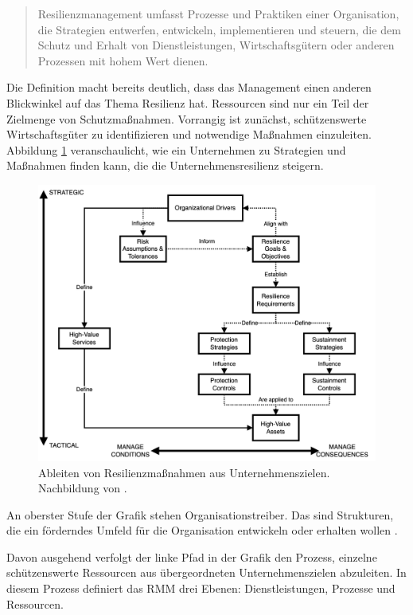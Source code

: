 \documentclass[]{lni}
\begin{document}
\begin{quote}
    Resilienzmanagement umfasst Prozesse und Praktiken einer Organisation, die Strategien entwerfen, entwickeln, implementieren und steuern, die dem Schutz und Erhalt von Dienstleistungen, Wirtschaftsgütern oder anderen Prozessen mit hohem Wert dienen.
    \cite[19]{CERT_RMM}
\end{quote}

Die Definition macht bereits deutlich, dass das Management einen anderen Blickwinkel auf das Thema Resilienz hat. Ressourcen sind nur ein Teil der Zielmenge von Schutzmaßnahmen. Vorrangig ist zunächst, schützenswerte Wirtschaftsgüter zu identifizieren und notwendige Maßnahmen einzuleiten. Abbildung \ref{fig:RmmServicesToAssets} veranschaulicht, wie ein Unternehmen zu Strategien und Maßnahmen finden kann, die die Unternehmensresilienz steigern.



\begin{figure}[ht]
    \centering
    \includegraphics[width=.9\textwidth]{images/RMM_strategy_deriviation_graph.drawio.png}
    \caption{Ableiten von Resilienzmaßnahmen aus Unternehmenszielen. Nachbildung von \cite[S. 26, Figure 9]{CERT_RMM}.}
    \label{fig:RmmServicesToAssets}
\end{figure}



An oberster Stufe der Grafik stehen Organisationstreiber. Das sind Strukturen, die ein förderndes Umfeld für die Organisation entwickeln oder erhalten wollen \cite{NationalImplementationResearchNetwork.}.

Davon ausgehend verfolgt der linke Pfad in der Grafik den Prozess, einzelne schützenswerte Ressourcen aus übergeordneten Unternehmenszielen abzuleiten. In diesem Prozess definiert das RMM drei Ebenen: Dienstleistungen, Prozesse und Ressourcen. 
\end{document}
